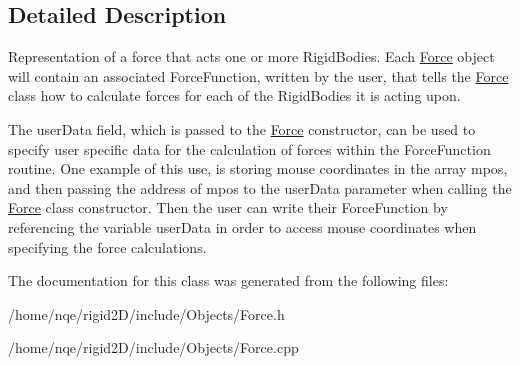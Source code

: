 \subsection{Detailed Description}
Representation of a force that acts one or more RigidBodies. Each \hyperlink{class_rigid2_d_1_1_force}{Force} object will contain an associated ForceFunction, written by the user, that tells the \hyperlink{class_rigid2_d_1_1_force}{Force} class how to calculate forces for each of the RigidBodies it is acting upon.

The userData field, which is passed to the \hyperlink{class_rigid2_d_1_1_force}{Force} constructor, can be used to specify user specific data for the calculation of forces within the ForceFunction routine. One example of this use, is storing mouse coordinates in the array mpos, and then passing the address of mpos to the userData parameter when calling the \hyperlink{class_rigid2_d_1_1_force}{Force} class constructor. Then the user can write their ForceFunction by referencing the variable userData in order to access mouse coordinates when specifying the force calculations. 

The documentation for this class was generated from the following files:\begin{DoxyCompactItemize}
\item 
/home/nqe/rigid2D/include/Objects/Force.h\item 
/home/nqe/rigid2D/include/Objects/Force.cpp\end{DoxyCompactItemize}
